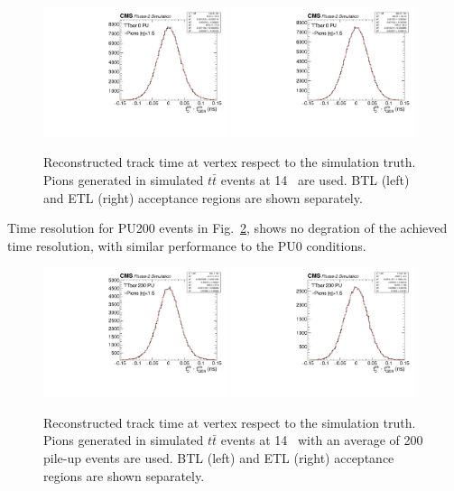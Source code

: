 \begin{figure}[!hbtp]
\centering
\includegraphics[width=0.48\textwidth]{fig/performance/ClusterAndTracks/res_t_pion_BTL.pdf}
\includegraphics[width=0.48\textwidth]{fig/performance/ClusterAndTracks/res_t_pion_ETL.pdf}
\caption{Reconstructed track time at vertex respect to the simulation truth. Pions generated in simulated $t\bar{t}$ events at 14~ are used. BTL (left) and ETL (right) acceptance regions are shown separately.}
\label{fig:trackt0vsgen}
\end{figure}

Time resolution for PU200 events in Fig.~\ref{fig:trackt0vsgen_PU200}, shows no degration of the achieved time resolution, with similar performance to the PU0 conditions.

\begin{figure}[!hbtp]
\centering
\includegraphics[width=0.48\textwidth]{fig/performance/ClusterAndTracks/res_t_pion_BTL_PU200.pdf}
\includegraphics[width=0.48\textwidth]{fig/performance/ClusterAndTracks/res_t_pion_ETL_PU200.pdf}
\caption{Reconstructed track time at vertex respect to the simulation truth. Pions generated in simulated $t\bar{t}$ events at 14~ with an average of 200 pile-up events are used. BTL (left) and ETL (right) acceptance regions are shown separately.}
\label{fig:trackt0vsgen_PU200}
\end{figure}

